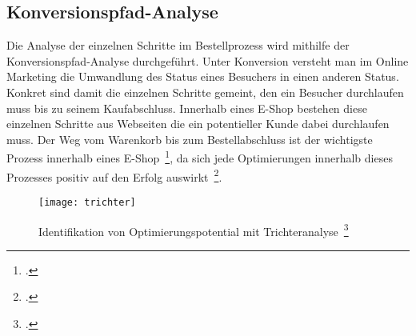 \subsection{Konversionspfad-Analyse}
Die Analyse der einzelnen Schritte im Bestellprozess wird mithilfe der Konversionspfad-Analyse durchgeführt. Unter Konversion versteht man im Online Marketing die Umwandlung des Status eines Besuchers in einen anderen Status. Konkret sind damit die einzelnen Schritte gemeint, den ein Besucher durchlaufen muss bis zu seinem Kaufabschluss. Innerhalb eines E-Shop bestehen diese einzelnen Schritte aus Webseiten die ein potentieller Kunde dabei durchlaufen muss. Der Weg vom Warenkorb bis zum Bestellabschluss ist der wichtigste Prozess innerhalb eines E-Shop~\footcite[Vgl. ][Seite 152]{Kaushik.2010}, da sich jede Optimierungen innerhalb dieses Prozesses positiv auf den Erfolg auswirkt~\footcite[Vgl. ][Seite 378]{Hassler.2010}. 

\begin{figure}[H]
	\begin{center}
		\texttt{[image: trichter]}
		\caption{Identifikation von Optimierungspotential mit Trichteranalyse~\footcite[Vgl. ][Seite 395]{Hassler.2010}}
	\end{center}
\end{figure}

